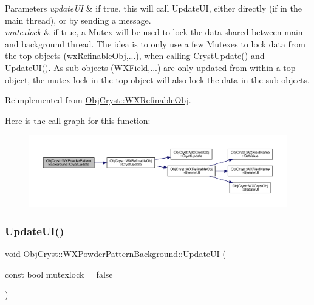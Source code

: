 \begin{DoxyParams}{Parameters}
{\em update\+UI} & if true, this will call Update\+UI, either directly (if in the main thread), or by sending a message. \\
\hline
{\em mutexlock} & if true, a Mutex will be used to lock the data shared between main and background thread. The idea is to only use a few Mutexes to lock data from the top objects (wx\+Refinable\+Obj,...), when calling \mbox{\hyperlink{class_obj_cryst_1_1_w_x_powder_pattern_background_a88a6987f3747b2538572e91f04b8f08d}{Cryst\+Update()}} and \mbox{\hyperlink{class_obj_cryst_1_1_w_x_powder_pattern_background_a7e54d0ef518f44f897d7363e7f96e4ae}{Update\+U\+I()}}. As sub-\/objects (\mbox{\hyperlink{class_obj_cryst_1_1_w_x_field}{W\+X\+Field}},...) are only updated from within a top object, the mutex lock in the top object will also lock the data in the sub-\/objects. \\
\hline
\end{DoxyParams}


Reimplemented from \mbox{\hyperlink{class_obj_cryst_1_1_w_x_refinable_obj_a8249d288e62ad1ebffeea91f77ae37a3}{Obj\+Cryst\+::\+W\+X\+Refinable\+Obj}}.

Here is the call graph for this function\+:
\nopagebreak
\begin{figure}[H]
\begin{center}
\leavevmode
\includegraphics[width=350pt]{class_obj_cryst_1_1_w_x_powder_pattern_background_a88a6987f3747b2538572e91f04b8f08d_cgraph}
\end{center}
\end{figure}
\mbox{\label{class_obj_cryst_1_1_w_x_powder_pattern_background_a7e54d0ef518f44f897d7363e7f96e4ae}} 
\subsubsection{\texorpdfstring{UpdateUI()}{UpdateUI()}}
{\footnotesize\ttfamily void Obj\+Cryst\+::\+W\+X\+Powder\+Pattern\+Background\+::\+Update\+UI (\begin{DoxyParamCaption}\item[{const bool}]{mutexlock = {\ttfamily false} }\end{DoxyParamCaption})\hspace{0.3cm}{\ttfamily [virtual]}}

